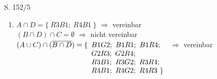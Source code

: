 \begin{Exercise}{S. 152/5}{}
\begin{enumerate}
\begin{enumerate}[label=\alph*),leftmargin=*]
{\begin{minipage}[t]{0.40\linewidth}
            \end{minipage}
            \begin{minipage}[t]{0.25\linewidth}
                \begin{align*}
                G &= \Omega
                \end{align*}
            \end{minipage}
            }
        \item[c)] {
            $A \cap D = \{ \ R3B1; \ R4B1 \ \}$ \quad $\Rightarrow$ \quad vereinbar\\[1.0ex]
            $(B \cap D) \cap C = \emptyset$ \quad $\Rightarrow$ \quad nicht vereinbar\\[1.0ex]
            $(A \cup C) \cap (\overline{B \cap D}) = \{\begin{array}[t]{l}
                        B1G2; \ B1R1; \ B1R4; \\
                        G2R3; \ G2R4; \\
                        R3B1; \ R3G2; \ R3R4; \\
                        R4B1; \ R4G2; \ R4R3 \ \} 
                    \end{array}$ \quad $\Rightarrow$ \quad vereinbar
            }
    \end{enumerate}
\end{enumerate}
\end{Exercise}
